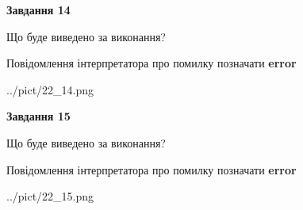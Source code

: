 \documentclass[11pt, ukrainian]{article}
\begin{document}
{\begin {large}
{\begin {center}\textbf{Завдання 14}\end {center}}\par
Що буде виведено за виконання? \par
Повідомлення інтерпретатора про помилку позначати \textbf{error}

\begin{center}
	{../pict/22_14.png}
\end{center}
\newpage

{\begin {center}\textbf{Завдання 15}\end {center}}\par
Що буде виведено за виконання? \par
Повідомлення інтерпретатора про помилку позначати \textbf{error}

\begin{center}
	{../pict/22_15.png}
\end{center}
\newpage

\end {large}}
\end{document}
